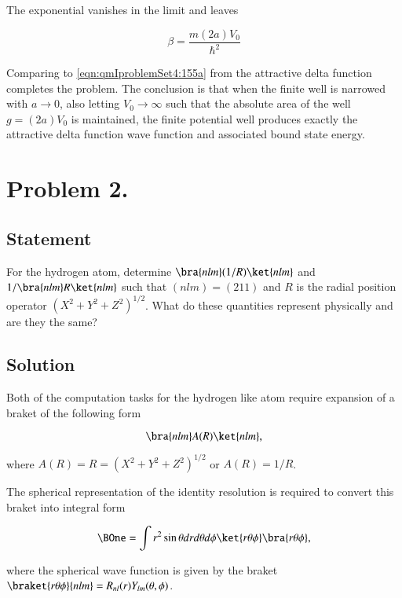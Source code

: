 The exponential vanishes in the limit and leaves

\begin{equation}\label{eqn:qmIproblemSet4:155}
\beta = \frac{m (2 a) V_0}{\hbar^2}
\end{equation}

Comparing to \ref{eqn:qmIproblemSet4:155a} from the attractive delta function completes the problem.  The conclusion is that when the finite well is narrowed with $a \rightarrow 0$, also letting $V_0 \rightarrow \infty$ such that the absolute area of the well $g = (2 a) V_0$ is maintained, the finite potential well produces exactly the attractive delta function wave function and associated bound state energy.

\section{Problem 2.}
\subsection{Statement}

For the hydrogen atom, determine $\bra{nlm}(1/R)\ket{nlm}$ and $1/\bra{nlm}R\ket{nlm}$ such that $(nlm)=(211)$ and $R$ is the radial position operator $(X^2+Y^2+Z^2)^{1/2}$. What do these quantities represent physically and are they the same?

\subsection{Solution}

Both of the computation tasks for the hydrogen like atom require expansion of a braket of the following form

\begin{equation}\label{eqn:qmIproblemSet4:200}
\bra{nlm} A(R) \ket{nlm},
\end{equation}

where $A(R) = R = (X^2 + Y^2 + Z^2)^{1/2}$ or $A(R) = 1/R$.

The spherical representation of the identity resolution is required to convert this braket into integral form

\begin{equation}\label{eqn:qmIproblemSet4:202}
\BOne = \int r^2 \sin\theta dr d\theta d\phi 
\ket{ r \theta \phi}
\bra{ r \theta \phi},
\end{equation}

where the spherical wave function is given by the braket $\braket{ r \theta \phi}{nlm} = R_{nl}(r) Y_{lm}(\theta,\phi)$.

